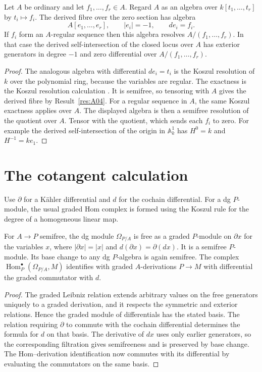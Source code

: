 \begin{example}\label{res:A05}
Let \(A\) be ordinary and let \(f_1,\ldots,f_r\in A\).
Regard \(A\) as an algebra over \(k[t_1,\ldots,t_r]\) by \(t_i\mapsto f_i\).
The derived fibre over the zero section has algebra
\[
     A[e_1,\ldots,e_r],\qquad |e_i|=-1,\qquad de_i=f_i .
\]
If \(f_i\) form an \(A\)-regular sequence then this algebra resolves
\(A/(f_1,\ldots,f_r)\). In that case the derived self-intersection
of the closed locus over \(A\) has exterior generators in degree
\(-1\) and zero differential over \(A/(f_1,\ldots,f_r)\).
\end{example}
\begin{proof}
The analogous algebra with differential \(de_i=t_i\) is the Koszul
resolution of \(k\) over the polynomial ring, because the variables
are regular. The exactness is the Koszul resolution calculation
\cite[RK-07]{ca-core}. It is semifree, so tensoring with \(A\)
gives the derived fibre by Result~\ref{res:A04}.
For a regular sequence in \(A\), the same Koszul exactness applies
over \(A\). The displayed algebra is then a semifree resolution of
the quotient over \(A\). Tensor with the quotient, which sends
each \(f_i\) to zero. For example the derived self-intersection of
the origin in \(\mathbb A^1_k\) has \(H^0=k\) and \(H^{-1}=k e_1\).
\end{proof}

\section{The cotangent calculation}

Use \(\partial\) for a K\"ahler differential and \(d\) for the
cochain differential. For a dg \(P\)-module, the usual graded Hom
complex is formed using the Koszul rule for the degree of a
homogeneous linear map.

\begin{lemma}\label{res:A06}
For \(A\to P\) semifree, the dg module \(\Omega_{P/A}\) is free
as a graded \(P\)-module on \(\partial x\) for the variables \(x\),
where \(|\partial x|=|x|\) and \(d(\partial x)=\partial(dx)\).
It is a semifree \(P\)-module. Its base change to any dg \(P\)-algebra
is again semifree. The complex
\(\operatorname{Hom}^{\bullet}_P(\Omega_{P/A},M)\) identifies with
graded \(A\)-derivations \(P\to M\) with differential the graded
commutator with \(d\).
\end{lemma}
\begin{proof}
The graded Leibniz relation extends arbitrary values on the free
generators uniquely to a graded derivation, and it respects
the symmetric and exterior relations. Hence the graded module of
differentials has the stated basis. The relation requiring
\(\partial\) to commute with the cochain differential determines
the formula for \(d\) on that basis. The derivative of \(dx\) uses
only earlier generators, so the corresponding filtration gives
semifreeness and is preserved by base change. The Hom--derivation
identification now commutes with its differential by evaluating
the commutators on the same basis.
\end{proof}

